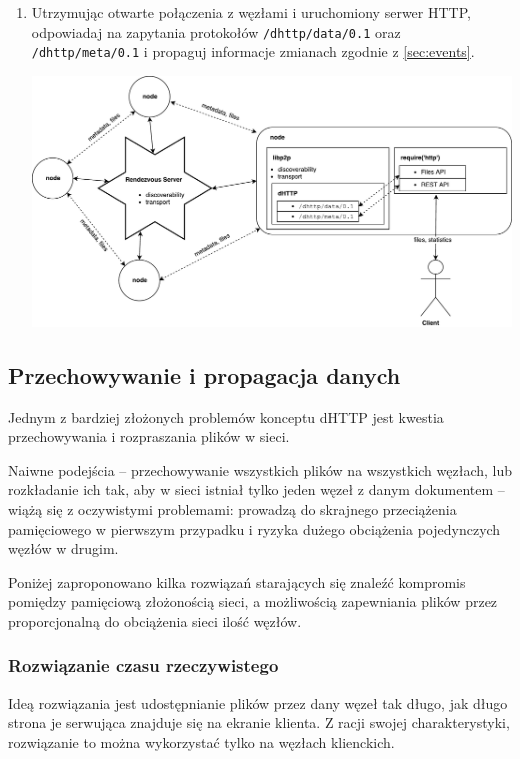 \begin{enumerate}[noitemsep]
    \item Utrzymując otwarte połączenia z węzłami i uruchomiony serwer HTTP, odpowiadaj na zapytania protokołów \texttt{/dhttp/data/0.1} oraz \texttt{/dhttp/meta/0.1} i propaguj informacje zmianach zgodnie z \ref{sec:events}. \\ \parbox{\linewidth}{\centering \includegraphics[scale=0.5]{communication-flow.pdf}}
\end{enumerate}


\subsection{Przechowywanie i propagacja danych}
\label{sec:dataPropagation}

Jednym z bardziej złożonych problemów konceptu dHTTP jest kwestia przechowywania i rozpraszania plików w sieci.

Naiwne podejścia -- przechowywanie wszystkich plików na wszystkich węzłach, lub rozkładanie ich tak, aby w sieci istniał tylko jeden węzeł z danym dokumentem -- wiążą się z oczywistymi problemami: prowadzą do skrajnego przeciążenia pamięciowego w pierwszym przypadku i ryzyka dużego obciążenia pojedynczych węzłów w drugim. 

Poniżej zaproponowano kilka rozwiązań starających się znaleźć kompromis pomiędzy pamięciową złożonością sieci, a możliwością zapewniania plików przez proporcjonalną do obciążenia sieci ilość węzłów.

\subsubsection{Rozwiązanie czasu rzeczywistego}
Ideą rozwiązania jest udostępnianie plików przez dany węzeł tak długo, jak długo strona je serwująca znajduje się na ekranie klienta. Z racji swojej charakterystyki, rozwiązanie to można wykorzystać tylko na węzłach klienckich.

